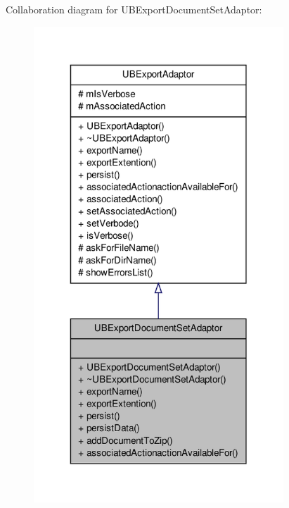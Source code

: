 Collaboration diagram for U\-B\-Export\-Document\-Set\-Adaptor\-:
\nopagebreak
\begin{figure}[H]
\begin{center}
\leavevmode
\includegraphics[width=266pt]{da/d2f/class_u_b_export_document_set_adaptor__coll__graph}
\end{center}
\end{figure}
